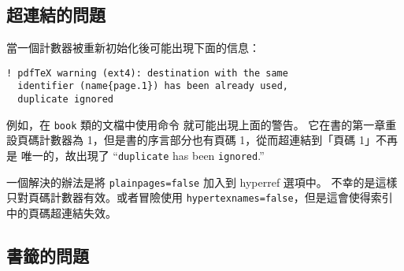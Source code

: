 \subsection{超連結的問題}


當一個計數器被重新初始化後可能出現下面的信息：
\begin{verbatim}
! pdfTeX warning (ext4): destination with the same
  identifier (name{page.1}) has been already used,
  duplicate ignored
\end{verbatim}
例如，在 \texttt{book} 類的文檔中使用命令  就可能出現上面的警告。
它在書的第一章重設頁碼計數器為 1，但是書的序言部分也有頁碼 1，從而超連結到「頁碼 1」不再是
唯一的，故出現了 ``\verb+duplicate+ has been \verb+ignored+.''


一個解決的辦法是將 \texttt{plainpages=false} 加入到 hyperref 選項中。
不幸的是這樣只對頁碼計數器有效。或者冒險使用
\texttt{hypertexnames=false}，但是這會使得索引中的頁碼超連結失效。

\subsection{書籤的問題}

